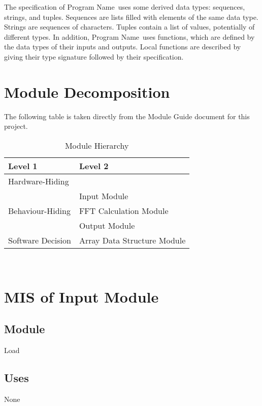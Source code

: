 \documentclass[12pt, titlepage]{article}
\newcommand{\progname}{Program Name}
\begin{document}
\noindent
The specification of \progname \ uses some derived data types: sequences, strings, and
tuples. Sequences are lists filled with elements of the same data type. Strings
are sequences of characters. Tuples contain a list of values, potentially of
different types. In addition, \progname \ uses functions, which
are defined by the data types of their inputs and outputs. Local functions are
described by giving their type signature followed by their specification.

\section{Module Decomposition}

The following table is taken directly from the Module Guide document for this project.

\begin{table}[h!]
\centering
\begin{tabular}{p{} p{}}
\toprule
\textbf{Level 1} & \textbf{Level 2}\\
\midrule

{Hardware-Hiding} & ~ \\
\midrule

\multirow{3}{0.3\textwidth}{Behaviour-Hiding}
& Input Module\\
& FFT Calculation Module\\
& Output  Module\\
\midrule

\multirow{1}{0.3\textwidth}{Software Decision} & Array Data Structure Module\\
\bottomrule

\end{tabular}
\caption{Module Hierarchy}
\label{TblMH}
\end{table}

~\newpage

\section{MIS of Input  Module} \label{Input}

\subsection{Module}

Load

\subsection{Uses}
None
\end{document}
